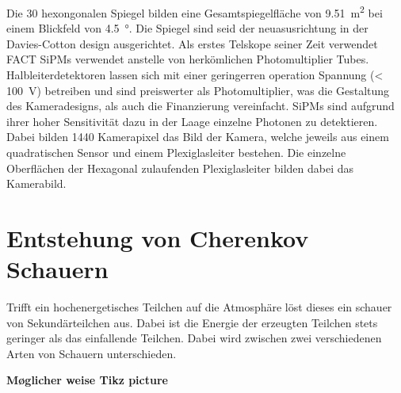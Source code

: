 Die 30 hexongonalen Spiegel bilden eine Gesamtspiegelfläche von \SI{9.51}{\meter\squared} bei einem Blickfeld von \SI{4.5}{\degree}. Die Spiegel sind seid der neuasusrichtung in der Davies-Cotton design ausgerichtet. \cite{??} 
Als erstes Telskope seiner Zeit verwendet FACT SiPMs verwendet anstelle von herkömlichen Photomultiplier Tubes. Halbleiterdetektoren lassen sich mit einer geringerren operation Spannung (< \SI{100}{\volt}) betreiben und sind preiswerter als Photomultiplier, was die Gestaltung des Kameradesigns, als auch die Finanzierung vereinfacht. SiPMs sind aufgrund ihrer hoher Sensitivität dazu in der Laage einzelne Photonen zu detektieren.
Dabei bilden 1440 Kamerapixel das Bild der Kamera, welche jeweils aus einem quadratischen Sensor und einem Plexiglasleiter bestehen. Die einzelne Oberflächen der Hexagonal zulaufenden Plexiglasleiter bilden dabei das Kamerabild.

\section{Entstehung von Cherenkov Schauern}
Trifft ein hochenergetisches Teilchen auf die Atmosphäre löst dieses ein schauer von Sekundärteilchen aus. Dabei ist die Energie der erzeugten Teilchen stets geringer als das einfallende Teilchen. Dabei wird zwischen zwei verschiedenen Arten von Schauern unterschieden. 

\textbf{Møglicher weise Tikz picture}

